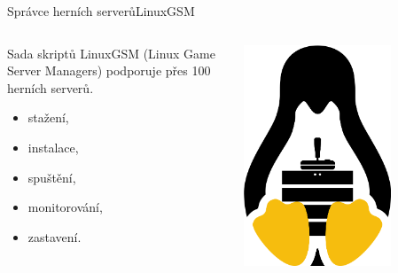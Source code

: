 \documentclass[czech,aspectratio=169]{beamer}
\begin{document}
  \begin{frame}{Správce herních serverů}{LinuxGSM}
    \begin{columns}
      \begin{column}{.6\textwidth}
        Sada skriptů LinuxGSM (Linux Game Server Managers) podporuje přes 100 herních serverů.
        \begin{itemize}
          \item stažení,
          \item instalace,
          \item spuštění,
          \item monitorování,
          \item zastavení.
        \end{itemize}
      \end{column}
      \begin{column}{.3\textwidth}
          \includegraphics[width=0.7\textwidth]{linuxgsm}
      \end{column}
    \end{columns}
  \end{frame}
\end{document}
